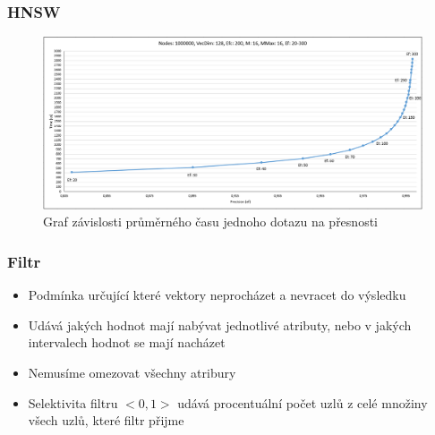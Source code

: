 \documentclass{beamer}
\begin{document}
	\begin{frame}
		\frametitle{HNSW}
		
		\begin{figure}
			\includegraphics[scale=0.34]{figures/graf_hnsw.png}
			\caption{Graf závislosti průměrného času jednoho dotazu na přesnosti}
		\end{figure}
		
	\end{frame}

	\begin{frame}
		\frametitle{Filtr}
		
		\begin{itemize}
			\item Podmínka určující které vektory neprocházet a nevracet do výsledku
			\item Udává jakých hodnot mají nabývat jednotlivé atributy, nebo v jakých intervalech hodnot se mají nacházet
			\item Nemusíme omezovat všechny atribury
			\item Selektivita filtru $<0,1>$ udává procentuální počet uzlů z celé množiny všech uzlů, které filtr přijme
			
		\end{itemize}
		
	\end{frame}
\end{document}
